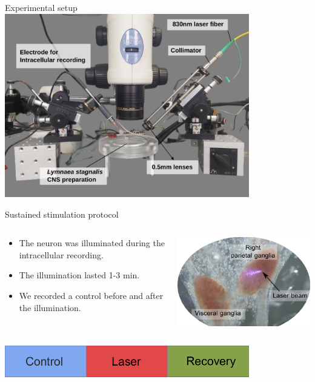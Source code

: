 \documentclass[aspectratio=43]{beamer}
\begin{document}
\begin{frame}{Experimental setup}
	\centering
	\includegraphics[width=0.8\textwidth]{methods/laser-setup_labels.png}
\end{frame}

\begin{frame}{Sustained stimulation protocol}
	\begin{columns}
		\begin{column}{0.65\textwidth}
			\begin{itemize}
				\item {The neuron was illuminated during the intracellular recording.}
				\item {The illumination lasted 1-3 min.}
				\item {We recorded a control before and after the illumination.}
			\end{itemize}
		\end{column}
		\begin{column}{0.35\textwidth}
			\includegraphics[width=\textwidth]{laser/laser-beam.pdf}
		\end{column}
	\end{columns} 
	\vspace{10pt}
	\centering
	\includegraphics[width=0.8\textwidth]{laser/trial-protocol.pdf}
\end{frame}
\end{document}

